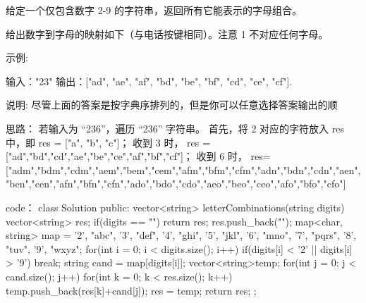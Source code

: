 给定一个仅包含数字 2-9 的字符串，返回所有它能表示的字母组合。

给出数字到字母的映射如下（与电话按键相同）。注意 1 不对应任何字母。

示例:

输入："23"
输出：["ad", "ae", "af", "bd", "be", "bf", "cd", "ce", "cf"].

说明:
尽管上面的答案是按字典序排列的，但是你可以任意选择答案输出的顺





































思路：
若输入为 “236”，遍历 “236” 字符串。
首先，将 2 对应的字符放入 res 中，即 res = ["a", "b", "c"]；
收到 3 时， res = ["ad","bd","cd","ae","be","ce","af","bf","cf"]；
收到 6 时， res=["adm","bdm","cdm","aem","bem","cem","afm","bfm","cfm","adn","bdn","cdn","aen","ben","cen","afn","bfn","cfn","ado","bdo","cdo","aeo","beo","ceo","afo","bfo","cfo"]































code：
class Solution {
public:
    vector<string> letterCombinations(string digits) {
        vector<string> res;
        if(digits == "") return res;
        res.push_back("");
        map<char, string> map = {{'2', "abc"},
                                 {'3', "def"},
                                 {'4', "ghi"},
                                 {'5', "jkl"},
                                 {'6', "mno"},
                                 {'7', "pqrs"},
                                 {'8', "tuv"},
                                 {'9', "wxyz"}};
        for(int i = 0; i < digits.size(); i++)
        {
            if(digits[i] < '2' || digits[i] > '9') break;
            string cand = map[digits[i]];
            vector<string>temp;
            for(int j = 0; j < cand.size(); j++)
            {
                for(int k = 0; k < res.size(); k++)
                    temp.push_back(res[k]+cand[j]);
            }
            res = temp;
        }
        return res;
    }
};